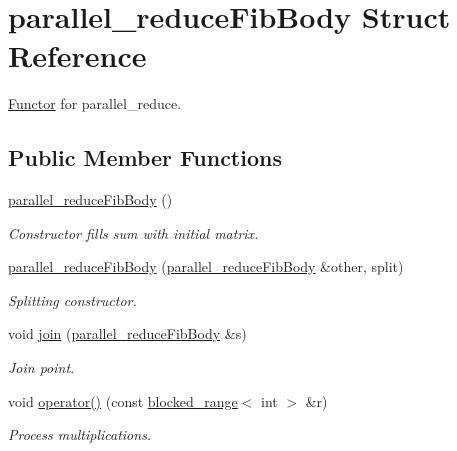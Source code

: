 \hypertarget{structparallel__reduceFibBody}{}\section{parallel\+\_\+reduce\+Fib\+Body Struct Reference}
\label{structparallel__reduceFibBody}


\hyperlink{structFunctor}{Functor} for parallel\+\_\+reduce.  


\subsection*{Public Member Functions}
\begin{DoxyCompactItemize}
\item 
\hypertarget{structparallel__reduceFibBody_a37da689701eb7eac04b85ac3da8d4b83}{}\hyperlink{structparallel__reduceFibBody_a37da689701eb7eac04b85ac3da8d4b83}{parallel\+\_\+reduce\+Fib\+Body} ()\label{structparallel__reduceFibBody_a37da689701eb7eac04b85ac3da8d4b83}

\begin{DoxyCompactList}\small\item\em Constructor fills sum with initial matrix. \end{DoxyCompactList}\item 
\hypertarget{structparallel__reduceFibBody_abb1b3c28cfde5ca6cab3bc30c570a278}{}\hyperlink{structparallel__reduceFibBody_abb1b3c28cfde5ca6cab3bc30c570a278}{parallel\+\_\+reduce\+Fib\+Body} (\hyperlink{structparallel__reduceFibBody}{parallel\+\_\+reduce\+Fib\+Body} \&other, split)\label{structparallel__reduceFibBody_abb1b3c28cfde5ca6cab3bc30c570a278}

\begin{DoxyCompactList}\small\item\em Splitting constructor. \end{DoxyCompactList}\item 
\hypertarget{structparallel__reduceFibBody_a5191e08384a7e904cff03a4e1917ae67}{}void \hyperlink{structparallel__reduceFibBody_a5191e08384a7e904cff03a4e1917ae67}{join} (\hyperlink{structparallel__reduceFibBody}{parallel\+\_\+reduce\+Fib\+Body} \&s)\label{structparallel__reduceFibBody_a5191e08384a7e904cff03a4e1917ae67}

\begin{DoxyCompactList}\small\item\em Join point. \end{DoxyCompactList}\item 
\hypertarget{structparallel__reduceFibBody_ae49e3eeeade96615a250bca966902ab9}{}void \hyperlink{structparallel__reduceFibBody_ae49e3eeeade96615a250bca966902ab9}{operator()} (const \hyperlink{classtbb_1_1blocked__range}{blocked\+\_\+range}$<$ int $>$ \&r)\label{structparallel__reduceFibBody_ae49e3eeeade96615a250bca966902ab9}

\begin{DoxyCompactList}\small\item\em Process multiplications. \end{DoxyCompactList}\end{DoxyCompactItemize}

